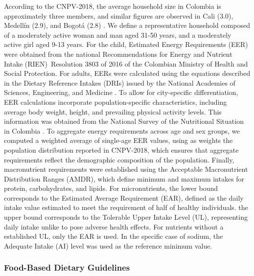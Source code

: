 \documentclass[Afour, sageh,times]{sagej}
\begin{document}
According to the CNPV-2018, the average household size in Colombia is approximately three members, and similar figures are observed in Cali (3.0), Medellín (2.9), and Bogotá (2.8) \citep{DANE2018CNPV}. We define a representative household composed of a moderately active woman and man aged 31-50 years, and a moderately active girl aged 9-13 years. For the child, Estimated Energy Requirements (EER) were obtained from the national Recommendations for Energy and Nutrient Intake (RIEN)\
{Resolution 3803 of 2016 of the Colombian Ministry of Health and Social Protection}. For adults, EERs were calculated using the equations described in the Dietary Reference Intakes (DRIs) issued by the National Academies of Sciences, Engineering, and Medicine \citep{NASEM2023Energy}. To allow for city-specific differentiation, EER calculations incorporate population-specific characteristics, including average body weight, height, and prevailing physical activity levels. This information was obtained from the National Survey of the Nutritional Situation in Colombia \citep{ENSIN2015}. To aggregate energy requirements across age and sex groups, we computed a weighted average of single-age EER values, using as weights the population distribution reported in CNPV-2018, which ensures that aggregate requirements reflect the demographic composition of the population. Finally, macronutrient requirements were established using the Acceptable Macronutrient Distribution Ranges (AMDR), which define minimum and maximum intakes for protein, carbohydrates, and lipids. For micronutrients, the lower bound corresponds to the Estimated Average Requirement (EAR), defined as the daily intake value estimated to meet the requirement of half of healthy individuals. the upper bound corresponds to the Tolerable Upper Intake Level (UL), representing daily intake unlike to pose adverse health effects. For nutrients without a established UL, only the EAR is used. In the specific case of sodium, the Adequate Intake (AI) level was used as the reference minimum value.

\subsubsection{Food-Based Dietary Guidelines}
\end{document}
